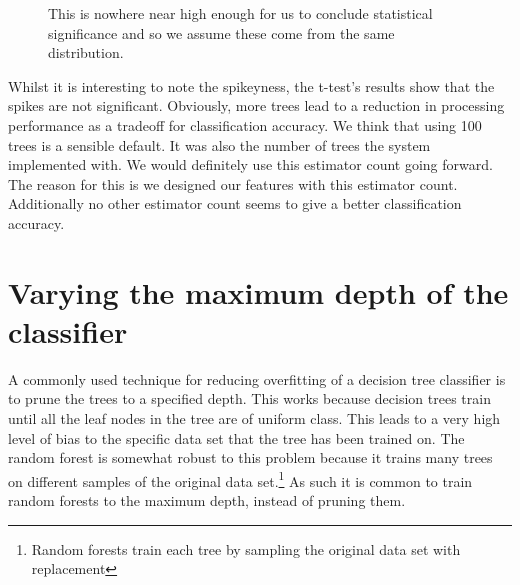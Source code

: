 \documentclass[ %
                    author={Sam Phippen},
                supervisor={Dr. Rafal Bogacz},
                     title={Real time voice activity detectors in noisy personal computing environments},
                  subtitle={},
                    degree={MEng},
                      year={2012} ]{thesis}
\begin{document}
\begin{figure}

    This is nowhere near high enough for us to conclude statistical significance and so we assume these come from the same distribution.

    \label{fig:t-test}

\end{figure}

Whilst it is interesting to note the spikeyness, the t-test's results show that
the spikes are not significant. Obviously, more trees lead to a reduction in
processing performance as a tradeoff for classification accuracy.  We think
that using 100 trees is a sensible default. It was also the number of trees the
system implemented with.  We would definitely use this estimator count going
forward. The reason for this is we designed our features with this estimator
count. Additionally no other estimator count seems to give a better
classification accuracy.

\section{Varying the maximum depth of the classifier}

A commonly used technique for reducing overfitting of a decision tree
classifier is to prune the trees to a specified
depth\cite{Bramer:2002:PCT:646288.686755}. This works because decision trees
train until all the leaf nodes in the tree are of uniform class. This leads to
a very high level of bias to the specific data set that the tree has been
trained on. The random forest is somewhat robust to this problem because it
trains many trees on different samples of the original data
set.\footnote{Random forests train each tree by sampling the original data set
with replacement} As such it is common to train random forests to the maximum
depth, instead of pruning them.
\end{document}
